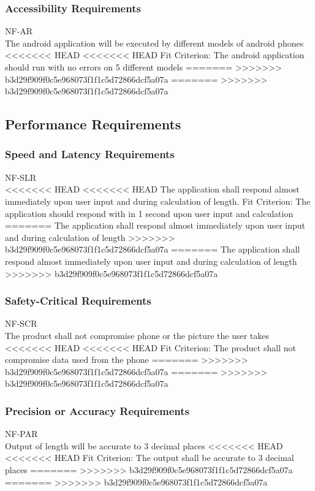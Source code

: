 \documentclass[12pt, titlepage]{article}
\begin{document}
\subsubsection{Accessibility Requirements}
NF-AR \\
The android application will be executed by different models of android phones
<<<<<<< HEAD
<<<<<<< HEAD
{\color{red}Fit Criterion: The android application should run with no errors on 5 different models }
=======
>>>>>>> b3d29f909f0c5e968073f1f1c5d72866dcf5a07a
=======
>>>>>>> b3d29f909f0c5e968073f1f1c5d72866dcf5a07a


\subsection{Performance Requirements}
\subsubsection{Speed and Latency Requirements}
NF-SLR \\
<<<<<<< HEAD
<<<<<<< HEAD
The application shall respond almost immediately upon user input and during calculation of length.
{\color{red}Fit Criterion: The application should respond with in 1 second upon user input and calculation  }
=======
The application shall respond almost immediately upon user input and during calculation of length 
>>>>>>> b3d29f909f0c5e968073f1f1c5d72866dcf5a07a
=======
The application shall respond almost immediately upon user input and during calculation of length 
>>>>>>> b3d29f909f0c5e968073f1f1c5d72866dcf5a07a

\subsubsection{Safety-Critical Requirements}
NF-SCR \\
The product shall not compromise phone or the picture the user takes
<<<<<<< HEAD
<<<<<<< HEAD
{\color{red}Fit Criterion: The product shall not compromise data used from the phone }
=======
>>>>>>> b3d29f909f0c5e968073f1f1c5d72866dcf5a07a
=======
>>>>>>> b3d29f909f0c5e968073f1f1c5d72866dcf5a07a

\subsubsection{Precision or Accuracy Requirements}
NF-PAR \\
Output of length will be accurate to 3 decimal places
<<<<<<< HEAD
<<<<<<< HEAD
{\color{red}Fit Criterion: The output shall be accurate to 3 decimal places }
=======
>>>>>>> b3d29f909f0c5e968073f1f1c5d72866dcf5a07a
=======
>>>>>>> b3d29f909f0c5e968073f1f1c5d72866dcf5a07a
\end{document}
